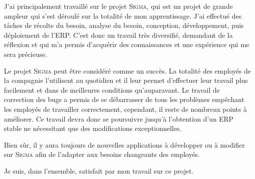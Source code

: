 J'ai principalement travaillé sur le projet \textsc{Sigma}, qui est un projet de grande ampleur qui s'est déroulé sur la totalité de mon apprentissage.
J'ai effectué des tâches de récolte du besoin, analyse du besoin, conception, développement, puis déploiement de l'ERP.
C'est donc un travail très diversifié, demandant de la réflexion et qui m'a permis d'acquérir des connaissances et une expérience qui me sera précieuse.

Le projet \textsc{Sigma} peut être considéré comme un succès.
La totalité des employés de la compagnie l'utilisent au quotidien et il leur permet d'effectuer leur travail plus facilement et dans de meilleures conditions qu'auparavant.
Le travail de correction des bugs a permis de se débarrasser de tous les problèmes empêchant les employés de travailler correctement, cependant, il reste de nombreux points à améliorer.
Ce travail devra donc se poursuivre jusqu'à l'obtention d'un ERP stable ne nécessitant que des modifications exceptionnelles.

Bien sûr, il y aura toujours de nouvelles applications à développer ou à modifier sur \textsc{Sigma} afin de l'adapter aux besoins changeants des employés.

Je suis, dans l'ensemble, satisfait par mon travail sur ce projet.